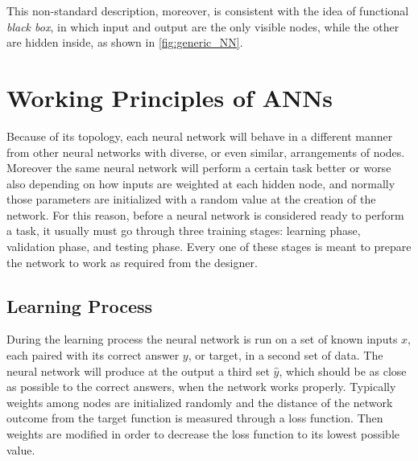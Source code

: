 This non-standard description, moreover, is consistent with the idea of functional \textit{black box}, in which input and output are the only visible nodes, while the other are hidden inside, as shown in \autoref{fig:generic_NN}.


\section{Working Principles of ANNs}
\label{sec:Working_Principles_of_ANNs}
Because of its topology, each neural network will behave in a different manner from other neural networks with diverse, or even similar, arrangements of nodes.
Moreover the same neural network will perform a certain task better or worse also depending on how inputs are weighted at each hidden node, and normally those parameters are initialized with a random value at the creation of the network.
For this reason, before a neural network is considered ready to perform a task, it usually must go through three training stages: learning phase, validation phase, and testing phase.
Every one of these stages is meant to prepare the network to work as required from the designer.

\subsection{Learning Process}
\label{ssec:Learning_Process}
During the learning process the neural network is run on a set of known inputs $x$, each paired with its correct answer $y$, or target, in a second set of data.
The neural network will produce at the output a third set $\hat{y}$, which should be as close as possible to the correct answers, when the network works properly.
Typically weights among nodes are initialized randomly and the distance of the network outcome from the target function is measured through a loss function.
Then weights are modified in order to decrease the loss function to its lowest possible value. %

